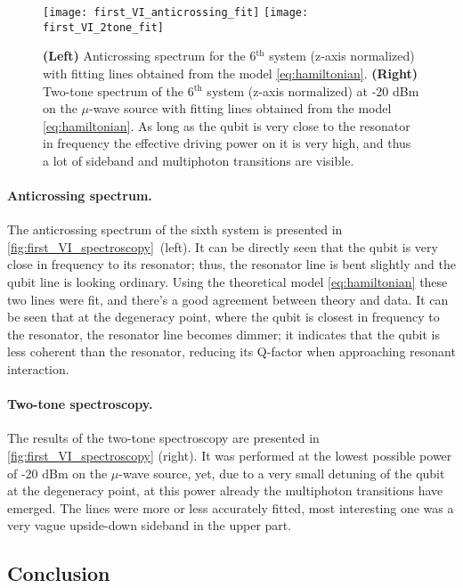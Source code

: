 \documentclass[12pt, twoside]{report}
\numberwithin{equation}{section}
\begin{document}
\begin{figure}[t]
\centering
\texttt{[image: first\_VI\_anticrossing\_fit]} \texttt{[image: first\_VI\_2tone\_fit]}

\caption{\textbf{(Left)} Anticrossing spectrum for the 6$^\text{th}$ system (z-axis normalized) with fitting lines obtained from the model \eqref{eq:hamiltonian}. \textbf{(Right)} Two-tone spectrum of the 6$^\text{th}$ system (z-axis normalized) at -20 dBm on the $\mu$-wave source with fitting lines obtained from the model \eqref{eq:hamiltonian}. As long as the qubit is very close to the resonator in frequency the effective driving power on it is very high, and thus a lot of sideband and multiphoton transitions are visible.}
\label{fig:first_VI_spectroscopy}
\end{figure}

\paragraph{Anticrossing spectrum.} The anticrossing spectrum of the sixth system is presented in \autoref{fig:first_VI_spectroscopy}~(left). It can be directly seen that the qubit is very close in frequency to its resonator; thus, the resonator line is bent slightly and the qubit line is looking ordinary. Using the theoretical model \eqref{eq:hamiltonian} these two lines were fit, and there's a good agreement between theory and data. It can be seen that at the degeneracy point, where the qubit is closest in frequency to the resonator, the resonator line becomes dimmer; it indicates that the qubit is less coherent than the resonator, reducing its Q-factor when approaching resonant interaction. 



\paragraph{Two-tone spectroscopy.} The results of the two-tone spectroscopy are presented in \autoref{fig:first_VI_spectroscopy} (right). It was performed at the lowest possible power of -20 dBm on the $\mu$-wave source, yet, due to a very small detuning of the qubit at the degeneracy point, at this power already the multiphoton transitions have emerged. The lines were more or less accurately fitted, most interesting one was a very vague upside-down sideband in the upper part.

\subsection{Conclusion} 
\end{document}
